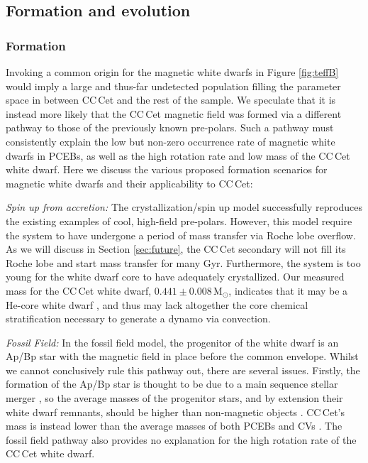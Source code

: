 \documentclass[fleqn,usenatbib]{mnras}
\newcommand{\Msun}{\mbox{$\mathrm{M}_{\odot}$}}
\begin{document}
\subsection{Formation and evolution}

\subsubsection{Formation}
Invoking a common origin for the magnetic white dwarfs in Figure \ref{fig:teffB} would imply a large and thus-far undetected population filling the parameter space in between CC\,Cet and the rest of the sample. We speculate that it is instead more likely that the CC\,Cet magnetic field was formed via a different pathway to those of the previously known pre-polars. Such a pathway must consistently explain the low but non-zero occurrence rate of magnetic white dwarfs in PCEBs, as well as the high rotation rate and low mass of the CC\,Cet white dwarf.
Here we discuss the various proposed formation scenarios for magnetic white dwarfs and their applicability to CC\,Cet:

\textit{Spin up from accretion:} The crystallization/spin up model \citep{iserneral17-1, schreiberetal21-1} successfully reproduces the existing examples of cool, high-field pre-polars. However, this model require the system to have undergone a period of mass transfer via Roche lobe overflow. As we will discuss in Section \ref{sec:future}, the CC\,Cet secondary will not fill its Roche lobe and start mass transfer for many Gyr. Furthermore, the system is too young for the white dwarf core to have adequately crystallized. Our measured mass for the CC\,Cet white dwarf, $0.441\pm0.008$\,\Msun, indicates that it may be a He-core white dwarf \citep{driebeetal98-1, althausetal13-1}, and thus may lack altogether the core chemical stratification necessary to generate a dynamo via convection. 

\textit{Fossil Field:} In the fossil field model, the progenitor of the white dwarf is an Ap/Bp star with the magnetic field in place before the common envelope. Whilst we cannot conclusively rule this pathway out, there are several issues. Firstly, the formation of the Ap/Bp star is thought to be due to a main sequence stellar merger \citep{braithwaite+spruit04-1}, so the average masses of the progenitor stars, and by extension their white dwarf remnants, should be higher than non-magnetic objects \citep{ferrarioetal20-1}. CC\,Cet's mass is instead lower than the average masses of both PCEBs and CVs \citep{zorotovicetal11-1}. The fossil field pathway also provides no explanation for the high rotation rate of the CC\,Cet white dwarf.
\end{document}
